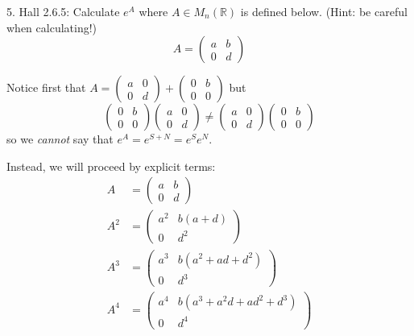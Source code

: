 \documentclass[12pt]{article}
\newcommand{\R}{\mathbb{R}}
\renewcommand{\R}{\mathbb{R}}
\begin{document}
5. Hall 2.6.5:  Calculate $e^{A}$ where $A \in M_{n}(\R)$ is defined below.  (Hint:  be careful when calculating!)  
\[A = \left(
\begin{array}{cc}
a & b \\
0 & d
\end{array}
\right)\]

    \color{blue}
        Notice first that $A = \begin{pmatrix}
            a & 0\\
            0 & d
        \end{pmatrix} + \begin{pmatrix}
            0 & b\\
            0 & 0
        \end{pmatrix}$ but 
        \[\begin{pmatrix}
            0 & b\\
            0 & 0
        \end{pmatrix} \begin{pmatrix}
            a & 0\\ 
            0 & d
        \end{pmatrix} \neq \begin{pmatrix}
            a & 0\\
            0 & d
        \end{pmatrix} \begin{pmatrix}
            0 & b\\
            0 & 0
        \end{pmatrix}\]
        so we \emph{cannot} say that $e^{A} = e^{S+N} = e^{S}e^{N}$. 

        Instead, we will proceed by explicit terms: 
        \begin{align*}
            A &= \begin{pmatrix}
                a & b\\
                0 & d
            \end{pmatrix}\\ 
            A^2 &= \begin{pmatrix}
                a^2 & b(a + d)\\
                0 & d^2
            \end{pmatrix}\\
            A^3 &= \begin{pmatrix}
                a^3 & b(a^2 + ad + d^2)\\
                0 & d^3
            \end{pmatrix}\\
            A^4 &= \begin{pmatrix}
                a^4 & b(a^3 + a^2d + ad^2 + d^3)\\
                0 & d^4
            \end{pmatrix}
        \end{align*}
\end{document}
